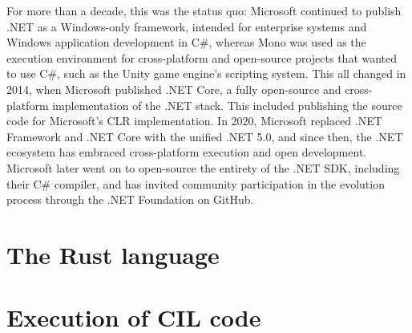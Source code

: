 For more than a decade, this was the status quo: Microsoft continued to publish .NET as a Windows-only framework, intended for enterprise systems and Windows
application development in C\#, whereas Mono was used as the execution environment for cross-platform and open-source projects that wanted to use C\#,
such as the Unity game engine's scripting system. %
This all changed in 2014, when Microsoft published .NET Core, a fully open-source and cross-platform implementation of the .NET stack.
This included publishing the source code for Microsoft's CLR implementation.
In 2020, Microsoft replaced .NET Framework and .NET Core with the unified .NET 5.0, and since then, the .NET ecosystem has embraced
cross-platform execution and open development.
Microsoft later went on to open-source the entirety of the .NET SDK, including their C\# compiler,
and has invited community participation in the evolution process through the .NET Foundation on GitHub.



\section{The Rust language}

\section{Execution of CIL code}
